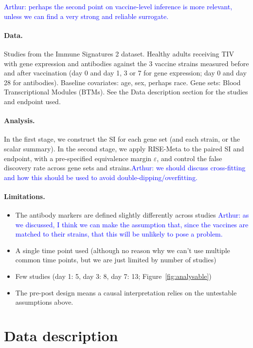 \documentclass{article}
\begin{document}
\textcolor{blue}{Arthur: perhaps the second point on vaccine-level inference is more relevant, unless we can find a very strong and reliable surrogate.}

\paragraph{Data.} Studies from the Immune Signatures 2 dataset. Healthy adults receiving TIV with gene expression and antibodies against the 3 vaccine strains measured before and after vaccination (day 0 and day 1, 3 or 7 for gene expression; day 0 and day 28 for antibodies). Baseline covariates: age, sex, perhaps race. Gene sets: Blood Transcriptional Modules (BTMs). See the Data description section for the studies and endpoint used.

\paragraph{Analysis.} In the first stage, we construct the SI for each gene set (and each strain, or the scalar summary). In the second stage, we apply RISE-Meta to the paired SI and endpoint, with a pre-specified equivalence margin $\varepsilon$, and control the false discovery rate across gene sets and strains.\textcolor{blue}{Arthur: we should discuss cross-fitting and how this should be used to avoid double-dipping/overfitting.}

\paragraph{Limitations.}
\begin{itemize}
    \item The antibody markers are defined slightly differently across studies
    \textcolor{blue}{Arthur: as we discussed, I think we can make the assumption that, since the vaccines are matched to their strains, that this will be unlikely to pose a problem.}
    \item A single time point used (although no reason why we can't use multiple common time points, but we are just limited by number of studies)
    \item Few studies (day 1: 5, day 3: 8, day 7: 13; Figure~\ref{fig:analysable})
    \item The pre-post design means a causal interpretation relies on the untestable assumptions above.
\end{itemize}

\section*{Data description}
\end{document}
